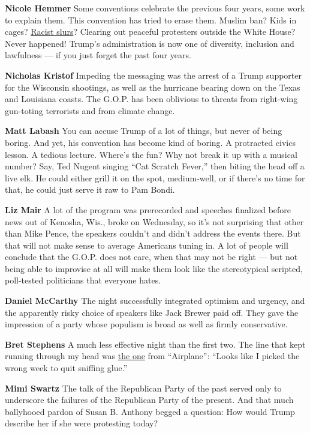 \textbf{Nicole Hemmer} Some conventions celebrate the previous four
years, some work to explain them. This convention has tried to erase
them. Muslim ban? Kids in cages?
\href{https://www.vox.com/2020/6/23/21300332/trump-coronavirus-racism-asian-americans}{Racist
slurs}? Clearing out peaceful protesters outside the White House? Never
happened! Trump's administration is now one of diversity, inclusion and
lawfulness --- if you just forget the past four years.

\textbf{Nicholas Kristof} Impeding the messaging was the arrest of a
Trump supporter for the Wisconsin shootings, as well as the hurricane
bearing down on the Texas and Louisiana coasts. The G.O.P. has been
oblivious to threats from right-wing gun-toting terrorists and from
climate change.

\textbf{Matt Labash} You can accuse Trump of a lot of things, but never
of being boring. And yet, his convention has become kind of boring. A
protracted civics lesson. A tedious lecture. Where's the fun? Why not
break it up with a musical number? Say, Ted Nugent singing ``Cat Scratch
Fever,'' then biting the head off a live elk. He could either grill it
on the spot, medium-well, or if there's no time for that, he could just
serve it raw to Pam Bondi.

\textbf{Liz Mair} A lot of the program was prerecorded and speeches
finalized before news out of Kenosha, Wis., broke on Wednesday, so it's
not surprising that other than Mike Pence, the speakers couldn't and
didn't address the events there. But that will not make sense to average
Americans tuning in. A lot of people will conclude that the G.O.P. does
not care, when that may not be right --- but not being able to improvise
at all will make them look like the stereotypical scripted, poll-tested
politicians that everyone hates.

\textbf{Daniel McCarthy} The night successfully integrated optimism and
urgency, and the apparently risky choice of speakers like Jack Brewer
paid off. They gave the impression of a party whose populism is broad as
well as firmly conservative.

\textbf{Bret Stephens} A much less effective night than the first two.
The line that kept running through my head was
\href{https://www.youtube.com/watch?v=lm8fYf53SMg}{the one} from
``Airplane'': ``Looks like I picked the wrong week to quit sniffing
glue.''

\textbf{Mimi Swartz} The talk of the Republican Party of the past served
only to underscore the failures of the Republican Party of the present.
And that much ballyhooed pardon of Susan B. Anthony begged a question:
How would Trump describe her if she were protesting today?

